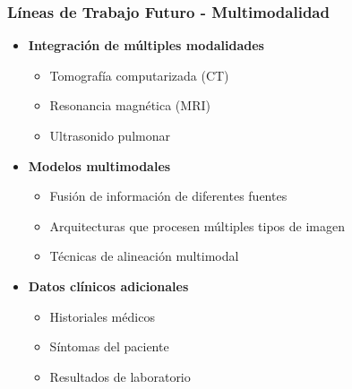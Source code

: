 \begin{frame}
\frametitle{Líneas de Trabajo Futuro - Multimodalidad}
\begin{itemize}
    \item \textbf{Integración de múltiples modalidades}
    \begin{itemize}
        \item Tomografía computarizada (CT)
        \item Resonancia magnética (MRI)
        \item Ultrasonido pulmonar
    \end{itemize}
    \item \textbf{Modelos multimodales}
    \begin{itemize}
        \item Fusión de información de diferentes fuentes
        \item Arquitecturas que procesen múltiples tipos de imagen
        \item Técnicas de alineación multimodal
    \end{itemize}
    \item \textbf{Datos clínicos adicionales}
    \begin{itemize}
        \item Historiales médicos
        \item Síntomas del paciente
        \item Resultados de laboratorio
    \end{itemize}
\end{itemize}
\end{frame}

